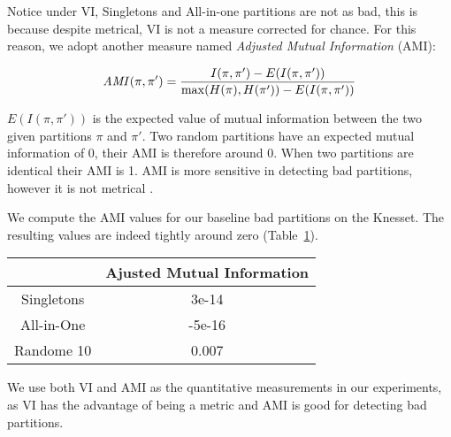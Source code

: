 Notice under VI, Singletons and All-in-one partitions are not as bad, this is
because despite metrical, VI is not a measure corrected for chance.
For this reason, we adopt another measure named \textit{Adjusted Mutual
Information} (AMI):

\[
  \mathit{AMI}(\pi, \pi') = \frac{I(\pi, \pi') - E(I(\pi, \pi'))}{\max(H(\pi), H(\pi')) - E(I(\pi, \pi'))}
\]

$E(I(\pi, \pi'))$ is the expected value of mutual information between
the two given partitions $\pi$ and $\pi'$.
Two random partitions have an expected mutual information of 0, their AMI
is therefore around 0.
When two partitions are identical their AMI is 1.
AMI is more sensitive in detecting bad partitions, however it is not metrical
\cite{Vinh:2010:ITM:1756006.1953024}.

We compute the AMI values for our baseline bad partitions on the Knesset.
The resulting values are indeed tightly around zero (Table~\ref{experiment:table:ami_baselines}).


\begin{table}[h!]
\label{experiment:table:ami_baselines}
\centering
\begin{tabular}{|c|c|}
\hline
       & Ajusted Mutual Information \\ \hline
Singletons & 3e-14 \\
All-in-One & -5e-16 \\
Randome 10 & 0.007 \\
\hline
\end{tabular}
\end{table}

We use both VI and AMI as the quantitative measurements in our experiments,
as VI has the advantage of being a metric and AMI is good for detecting bad
partitions.

